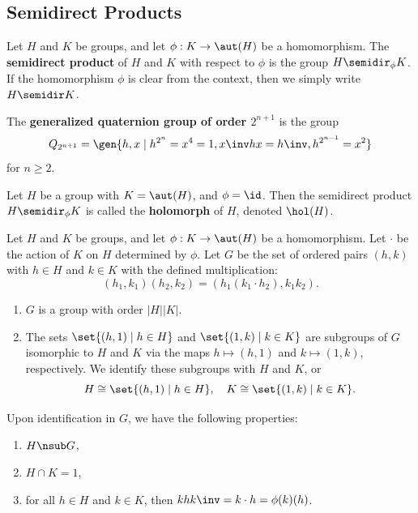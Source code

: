 \newpage

\subsection{Semidirect Products}

\begin{defn}
    \item Let $H$ and $K$ be groups, and let $\phi : K \to \aut(H)$ be a homomorphism. The \textbf{semidirect product} of $H$ and $K$ with respect to $\phi$ is the group $H \semidir_\phi K$. If the homomorphism $\phi$ is clear from the context, then we simply write $H \semidir K$.
    \item The \textbf{generalized quaternion group of order $2^{n + 1}$} is the group
    \[Q_{2^{n + 1}} = \gen{h, x \mid h^{2^n} = x^4 = 1, x\inv hx = h\inv, h^{2^{n - 1}} = x^2}\]
    for $n \geq 2$.
    \item Let $H$ be a group with $K = \aut(H)$, and $\phi = \id$. Then the semidirect product $H \semidir_\phi K$ is called the \textbf{holomorph} of $H$, denoted $\hol(H)$.
\end{defn}

\begin{theo}
    \label{theo5.10}
    Let $H$ and $K$ be groups, and let $\phi : K \to \aut(H)$ be a homomorphism. Let $\cdot$ be the action of $K$ on $H$ determined by $\phi$. Let $G$ be the set of ordered pairs $(h, k)$ with $h \in H$ and $k \in K$ with the defined multiplication:
    \[(h_1, k_1)(h_2, k_2) = (h_1 (k_1 \cdot h_2), k_1 k_2).\]
    \begin{enumerate}
        \item $G$ is a group with order $|H||K|$.
        \item The sets $\set{(h, 1) \mid h \in H}$ and $\set{(1, k) \mid k \in K}$ are subgroups of $G$ isomorphic to $H$ and $K$ via the maps $h \mapsto (h, 1)$ and $k \mapsto (1, k)$, respectively. We identify these subgroups with $H$ and $K$, or
        \[H \cong \set{(h, 1) \mid h \in H}, \quad K \cong \set{(1, k) \mid k \in K}.\]
    \end{enumerate}
    Upon identification in $G$, we have the following properties:
    \begin{enumerate}[resume]
        \item $H \nsub G$,
        \item $H \cap K = 1$,
        \item for all $h \in H$ and $k \in K$, then $khk\inv = k \cdot h = \phi(k)(h)$.
    \end{enumerate}
\end{theo}

